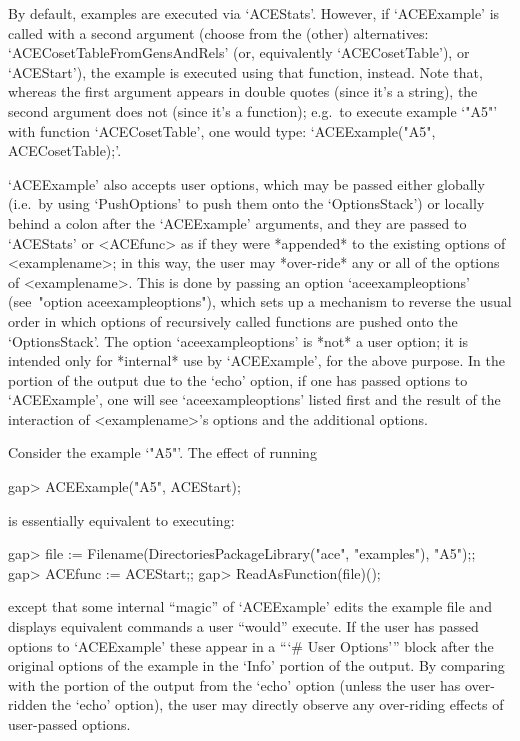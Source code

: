 By  default,  examples  are  executed  via  `ACEStats'.  However,   if
`ACEExample' is called with a second argument (choose from the (other)
alternatives:   `ACECosetTableFromGensAndRels'    (or,    equivalently
`ACECosetTable'), or `ACEStart'), the example is executed  using  that
function, instead. Note that, whereas the first  argument  appears  in
double quotes (since it's a string),  the  second  argument  does  not
(since it's a function); e.g.~to execute example `"A5"' with  function
`ACECosetTable', one would type: `ACEExample("A5", ACECosetTable);'.

`ACEExample' also accepts user options, which  may  be  passed  either
globally  (i.e.~by  using  `PushOptions'  to  push   them   onto   the
`OptionsStack') or locally  behind  a  colon  after  the  `ACEExample'
arguments, and they are passed to `ACEStats' or <ACEfunc> as  if  they
were *appended* to the existing options of <examplename>; in this way,
the user may *over-ride* any or all of the options  of  <examplename>.
This is done by passing  an  option  `aceexampleoptions'  (see~"option
aceexampleoptions"), which sets up a mechanism to  reverse  the  usual
order in which options of recursively called functions are pushed onto
the `OptionsStack'. The option `aceexampleoptions'  is  *not*  a  user
option; it is intended only for *internal* use  by  `ACEExample',  for
the above purpose. In the portion of the  output  due  to  the  `echo'
option, if one has  passed  options  to  `ACEExample',  one  will  see
`aceexampleoptions' listed first and the result of the interaction  of
<examplename>'s options and the additional options.

Consider the example `"A5"'. The effect of running

\beginexample
gap> ACEExample("A5", ACEStart);
\endexample

is essentially equivalent to executing:

\beginexample
gap> file := Filename(DirectoriesPackageLibrary("ace", "examples"), "A5");;
gap> ACEfunc := ACEStart;;
gap> ReadAsFunction(file)();
\endexample

except that some internal ``magic'' of `ACEExample' edits the  example
file and displays equivalent commands a user ``would'' execute. If the
user  has  passed  options  to  `ACEExample'   these   appear   in   a
```\# User Options''' block after the original options of the  example
in the `Info' portion of the output. By comparing with the portion  of
the output from the `echo' option (unless the user has over-ridden the
`echo' option), the user may directly observe any over-riding  effects
of user-passed options.

